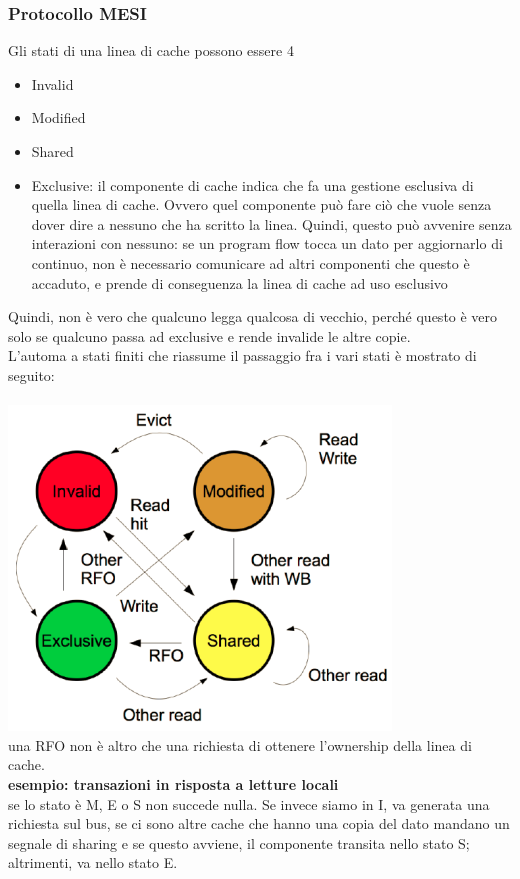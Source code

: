 \documentclass[14pt, oneside]{book}
\begin{document}
\subsubsection{Protocollo MESI}
Gli stati di una linea di cache possono essere 4
\begin{itemize}
\item Invalid
\item Modified
\item Shared
\item Exclusive: il componente di cache indica che fa una gestione esclusiva di quella linea di cache. Ovvero quel componente può fare ciò che vuole senza dover dire a nessuno che ha scritto la linea. Quindi, questo può avvenire senza interazioni con nessuno: se un program flow tocca un dato per aggiornarlo di continuo, non è necessario comunicare ad altri componenti che questo è accaduto, e prende di conseguenza la linea di cache ad uso esclusivo
\end{itemize}
Quindi, non è vero che qualcuno legga qualcosa di vecchio, perché questo è vero solo se qualcuno passa ad exclusive e rende invalide le altre copie.\\ L'automa a stati finiti che riassume il passaggio fra i vari stati è mostrato di seguito:\\\\
\includegraphics[scale=0.5]{immagini/MESI}\\
una RFO non è altro che una richiesta di ottenere l'ownership della linea di cache.\\
\textbf{esempio: transazioni in risposta a letture locali}\\
se lo stato è M, E o S non succede nulla. Se invece siamo in I, va generata una richiesta sul bus, se ci sono altre cache che hanno una copia del dato mandano un segnale di sharing e se questo avviene, il componente transita nello stato S; altrimenti, va nello stato E.
\end{document}
